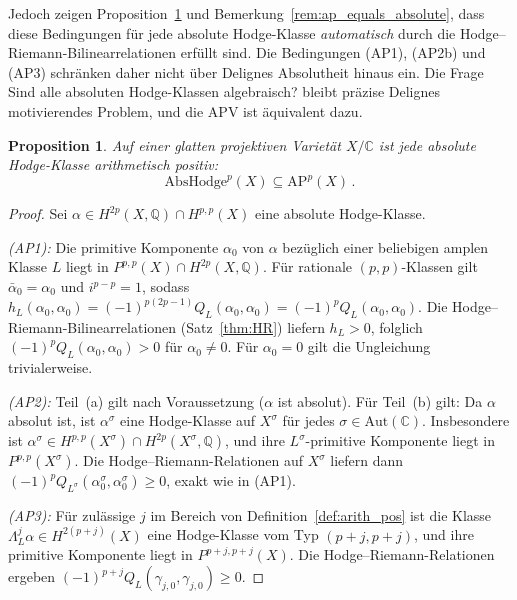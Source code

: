 \documentclass[aps,prd,twocolumn,superscriptaddress,nofootinbib]{revtex4-2}
\newtheorem{proposition}[theorem]{Proposition}
\theoremstyle{definition}
\theoremstyle{remark}
\begin{document}
Jedoch zeigen Proposition~\ref{prop:absolute_implies_ap} und Bemerkung~\ref{rem:ap_equals_absolute}, dass diese Bedingungen für jede absolute Hodge-Klasse \textit{automatisch} durch die Hodge--Riemann-Bilinearrelationen erfüllt sind. Die Bedingungen (AP1), (AP2b) und (AP3) schränken daher nicht über Delignes Absolutheit hinaus ein. Die Frage \glqq Sind alle absoluten Hodge-Klassen algebraisch?\grqq{} bleibt präzise Delignes motivierendes Problem, und die APV ist äquivalent dazu.

\begin{proposition}
\label{prop:absolute_implies_ap}
Auf einer glatten projektiven Varietät $X/\mathbb{C}$ ist jede absolute Hodge-Klasse arithmetisch positiv:
\begin{equation}
\mathrm{AbsHodge}^p(X) \subseteq \mathrm{AP}^p(X)\,.
\end{equation}
\end{proposition}

\begin{proof}
Sei $\alpha \in H^{2p}(X, \mathbb{Q}) \cap H^{p,p}(X)$ eine absolute Hodge-Klasse.

\textit{(AP1):} Die primitive Komponente $\alpha_0$ von $\alpha$ bezüglich einer beliebigen amplen Klasse $L$ liegt in $P^{p,p}(X) \cap H^{2p}(X, \mathbb{Q})$. Für rationale $(p,p)$-Klassen gilt $\bar{\alpha}_0 = \alpha_0$ und $i^{p-p} = 1$, sodass $h_L(\alpha_0, \alpha_0) = (-1)^{p(2p-1)} Q_L(\alpha_0, \alpha_0) = (-1)^p Q_L(\alpha_0, \alpha_0)$. Die Hodge--Riemann-Bilinearrelationen (Satz~\ref{thm:HR}) liefern $h_L > 0$, folglich $(-1)^p Q_L(\alpha_0, \alpha_0) > 0$ für $\alpha_0 \neq 0$. Für $\alpha_0 = 0$ gilt die Ungleichung trivialerweise.

\textit{(AP2):} Teil~(a) gilt nach Voraussetzung ($\alpha$ ist absolut). Für Teil~(b) gilt: Da $\alpha$ absolut ist, ist $\alpha^\sigma$ eine Hodge-Klasse auf $X^\sigma$ für jedes $\sigma \in \mathrm{Aut}(\mathbb{C})$. Insbesondere ist $\alpha^\sigma \in H^{p,p}(X^\sigma) \cap H^{2p}(X^\sigma, \mathbb{Q})$, und ihre $L^\sigma$-primitive Komponente liegt in $P^{p,p}(X^\sigma)$. Die Hodge--Riemann-Relationen auf $X^\sigma$ liefern dann $(-1)^p Q_{L^\sigma}(\alpha_0^\sigma, \alpha_0^\sigma) \geq 0$, exakt wie in (AP1).

\textit{(AP3):} Für zulässige $j$ im Bereich von Definition~\ref{def:arith_pos} ist die Klasse $\Lambda_L^j \alpha \in H^{2(p+j)}(X)$ eine Hodge-Klasse vom Typ $(p+j, p+j)$, und ihre primitive Komponente liegt in $P^{p+j, p+j}(X)$. Die Hodge--Riemann-Relationen ergeben $(-1)^{p+j} Q_L(\gamma_{j,0}, \gamma_{j,0}) \geq 0$.
\end{proof}
\end{document}
